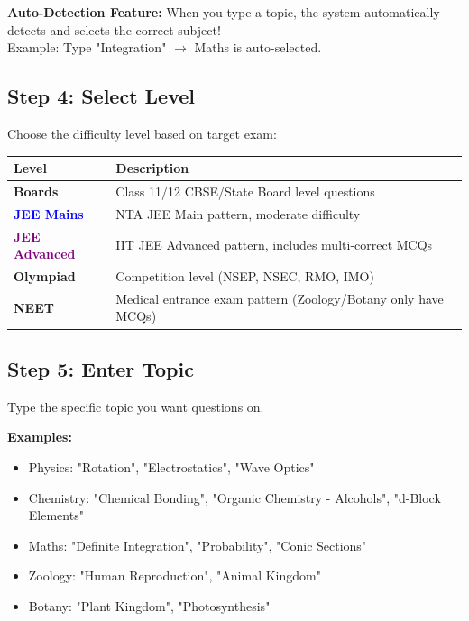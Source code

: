 \documentclass[11pt,a4paper]{article}
\begin{document}
\begin{tcolorbox}[tipbox]
\textbf{Auto-Detection Feature:} When you type a topic, the system automatically detects and selects the correct subject!\\
Example: Type "Integration" $\rightarrow$ Maths is auto-selected.
\end{tcolorbox}

\subsection{Step 4: Select Level}

Choose the difficulty level based on target exam:

\begin{center}
\renewcommand{\arraystretch}{1.5}
\begin{tabularx}{\textwidth}{|l|X|}
\hline
\textbf{Level} & \textbf{Description} \\
\hline
\textcolor{green!60!black}{\textbf{Boards}} & Class 11/12 CBSE/State Board level questions \\
\hline
\textcolor{blue}{\textbf{JEE Mains}} & NTA JEE Main pattern, moderate difficulty \\
\hline
\textcolor{purple}{\textbf{JEE Advanced}} & IIT JEE Advanced pattern, includes multi-correct MCQs \\
\hline
\textcolor{orange!80!black}{\textbf{Olympiad}} & Competition level (NSEP, NSEC, RMO, IMO) \\
\hline
\textcolor{pink!80!black}{\textbf{NEET}} & Medical entrance exam pattern (Zoology/Botany only have MCQs) \\
\hline
\end{tabularx}
\end{center}

\subsection{Step 5: Enter Topic}

Type the specific topic you want questions on.

\textbf{Examples:}
\begin{itemize}[leftmargin=*]
    \item Physics: "Rotation", "Electrostatics", "Wave Optics"
    \item Chemistry: "Chemical Bonding", "Organic Chemistry - Alcohols", "d-Block Elements"
    \item Maths: "Definite Integration", "Probability", "Conic Sections"
    \item Zoology: "Human Reproduction", "Animal Kingdom"
    \item Botany: "Plant Kingdom", "Photosynthesis"
\end{itemize}
\end{document}
